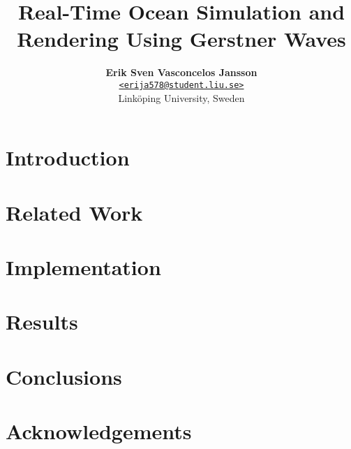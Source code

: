 \documentclass[a4paper, twocolumn]{article}
\title{\vspace{-1.5em}\textbf{Real-Time Ocean Simulation and \\
                              Rendering Using Gerstner Waves}}
\author{{\textbf{Erik Sven Vasconcelos Jansson}} \\
        {\href{mailto:erija578@student.liu.se}
        {\texttt{<erija578@student.liu.se>}}} \\
        {Linköping University, Sweden}}
\begin{document}
    \maketitle

    \begin{abstract}  \end{abstract}
    \section{Introduction} \label{sec:introduction} 
    \section{Related Work} \label{sec:related_work} 
    \section{Implementation} \label{sec:implementation} 
    \section{Results} \label{sec:results} 
    \section{Conclusions} \label{sec:conclusions} 

    \newpage

    \section*{Acknowledgements}

    \nocite{*} %
    
    
    \appendix

    
\end{document}
